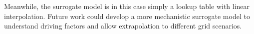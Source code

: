 \documentclass[10pt,twoside]{article}
\begin{document}

Meanwhile, the surrogate model is in this case simply a lookup table with linear interpolation.
Future work could develop a more mechanistic surrogate model to understand driving factors and allow extrapolation to different grid scenarios.

\end{document}
